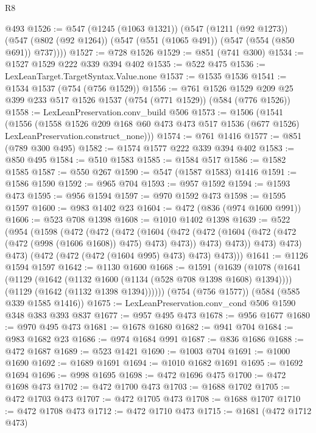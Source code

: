 \begin{lexlean}{R8}
\begin{coremodule}
    @493
@1526 := @547
    (@1245 (@1063 @1321))
    (@547
      (@1211 (@92 @1273))
      (@547 (@802 (@92 @1264)) (@547 (@551 (@1065 @491)) (@547 (@554 (@850 @691)) @737))))
@1527 := @728 @1526
@1529 := @851 (@741 @300)
@1534 := @1527 @1529 @222 @339 @394 @402
@1535 := @522 @475
@1536 := LexLeanTarget.TargetSyntax.Value.none
@1537 := @1535 @1536
@1541 := @1534 @1537 (@754 (@756 @1529))
@1556 := @761
    @1526
    @1529
    @209
    @25
    @399
    @233
    @517
    @1526
    @1537
    (@754 (@771 @1529))
    (@584 (@776 @1526))
@1558 := LexLeanPreservation.conv_build @506
@1573 := @1506
    (@1541
      (@1556
        (@1558
          @1526
          @209
          @168
          @60
          @473
          @473
          @517
          @1536
          (@677 @1526)
          LexLeanPreservation.construct_none)))
@1574 := @761 @1416
@1577 := @851 (@789 @300 @495)
@1582 := @1574 @1577 @222 @339 @394 @402
@1583 := @850 @495
@1584 := @510 @1583
@1585 := @1584 @517
@1586 := @1582 @1585
@1587 := @550 @267
@1590 := @547 (@1587 @1583) @1416
@1591 := @1586 @1590
@1592 := @965 @704
@1593 := @957 @1592
@1594 := @1593 @473
@1595 := @956 @1594
@1597 := @970 @1592 @473
@1598 := @1595 @1597
@1600 := @983 @1402 @23
@1604 := @472 (@836 (@974 @1600 @991))
@1606 := @523 @708 @1398
@1608 := @1010 @1402 @1398
@1639 := @522
    (@954
      (@1598
        (@472
          (@472
            (@472
              (@1604
                (@472
                  (@472 (@1604 (@472 (@472 (@472 (@998 (@1606 @1608)) @475) @473) @473)) @473)
                  @473))
              @473)
            @473)
          @473)
        (@472 (@472 (@472 (@1604 @995) @473) @473) @473)))
@1641 := @1126 @1594 @1597
@1642 := @1130 @1600
@1668 := @1591
    (@1639
      (@1078
        (@1641
          (@1129 (@1642 (@1132 @1600 (@1134 (@528 @708 @1398 @1608) @1394))))
          (@1129 (@1642 (@1132 @1398 @1394))))))
    (@754 (@756 @1577))
    (@584 (@585 @339 @1585 @1416))
@1675 := LexLeanPreservation.conv_cond @506 @1590 @348 @383 @393 @837
@1677 := @957 @495 @473
@1678 := @956 @1677
@1680 := @970 @495 @473
@1681 := @1678 @1680
@1682 := @941 @704
@1684 := @983 @1682 @23
@1686 := @974 @1684 @991
@1687 := @836 @1686
@1688 := @472 @1687
@1689 := @523 @1421
@1690 := @1003 @704
@1691 := @1000 @1690
@1692 := @1689 @1691
@1694 := @1010 @1682 @1691
@1695 := @1692 @1694
@1696 := @998 @1695
@1698 := @472 @1696 @475
@1700 := @472 @1698 @473
@1702 := @472 @1700 @473
@1703 := @1688 @1702
@1705 := @472 @1703 @473
@1707 := @472 @1705 @473
@1708 := @1688 @1707
@1710 := @472 @1708 @473
@1712 := @472 @1710 @473
@1715 := @1681 (@472 @1712 @473)

\end{coremodule}
\end{lexlean}
